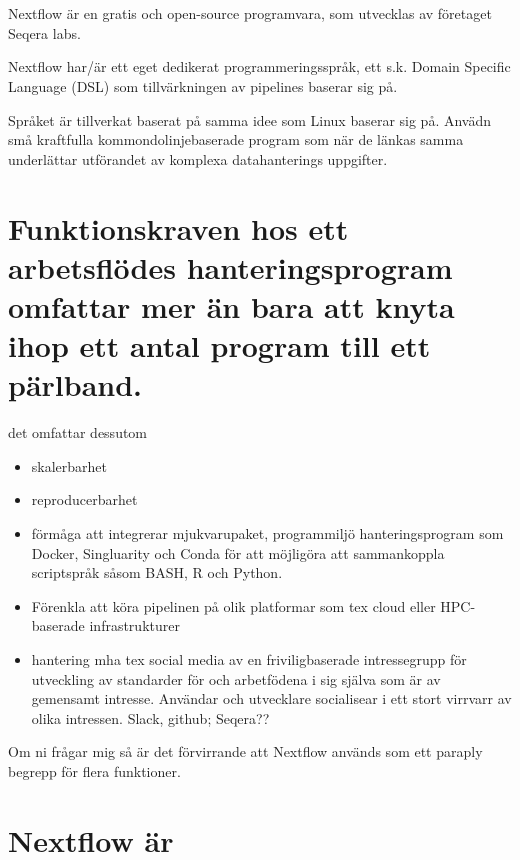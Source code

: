 \documentclass[
  letterpaper,
  DIV=11,
  numbers=noendperiod]{scrreprt}
\begin{document}
\section{}\label{section-2}

Nextflow är en gratis och open-source programvara, som utvecklas av
företaget Seqera labs.

Nextflow har/är ett eget dedikerat programmeringsspråk, ett s.k. Domain
Specific Language (DSL) som tillvärkningen av pipelines baserar sig på.

Språket är tillverkat baserat på samma idee som Linux baserar sig på.
Anvädn små kraftfulla kommondolinjebaserade program som när de länkas
samma underlättar utförandet av komplexa datahanterings uppgifter.

\section{Funktionskraven hos ett arbetsflödes hanteringsprogram omfattar
mer än bara att knyta ihop ett antal program till ett
pärlband.}\label{funktionskraven-hos-ett-arbetsfluxf6des-hanteringsprogram-omfattar-mer-uxe4n-bara-att-knyta-ihop-ett-antal-program-till-ett-puxe4rlband.}

det omfattar dessutom

\begin{itemize}
\item
  skalerbarhet
\item
  reproducerbarhet
\item
  förmåga att integrerar mjukvarupaket, programmiljö hanteringsprogram
  som Docker, Singluarity och Conda för att möjligöra att sammankoppla
  scriptspråk såsom BASH, R och Python.
\item
  Förenkla att köra pipelinen på olik platformar som tex cloud eller
  HPC-baserade infrastrukturer
\item
  hantering mha tex social media av en friviligbaserade intressegrupp
  för utveckling av standarder för och arbetfödena i sig själva som är
  av gemensamt intresse. Användar och utvecklare socialisear i ett stort
  virrvarr av olika intressen. Slack, github; Seqera??
\end{itemize}

Om ni frågar mig så är det förvirrande att Nextflow används som ett
paraply begrepp för flera funktioner.

\section{Nextflow är}\label{nextflow-uxe4r}
\end{document}
